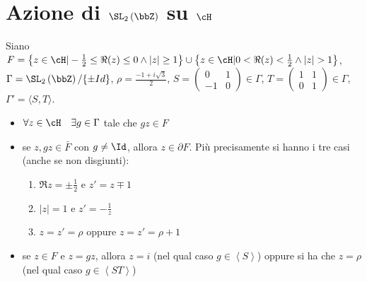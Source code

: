
\section{Azione di $\SL_2 \left( \bbZ \right)$ su $\cH$}

Siano $F=\left\{z \in \cH | -\frac{1}{2} \leq \Re(z) \leq 0
\wedge |z| \geq 1 \right\} \cup
\left\{z \in \cH | 0 < \Re(z) < \frac{1}{2} \wedge |z| > 1 \right\}$,
$\Gamma = \SL_2 \left( \bbZ \right)/\{\pm Id\}$,   $\rho=\frac{-1+i\sqrt{3}}{2}$,
$S=\left( \begin{array}{cc} 0 & 1 \\ -1 & 0 \end{array} \right) \in \Gamma$,
$T=\left( \begin{array}{cc} 1 & 1 \\ 0 & 1 \end{array} \right) \in \Gamma$,
$\Gamma' = \langle S, T \rangle$.

\begin{teorema}
\begin{itemize}
\item[P0] $\forall z \in \cH \quad \exists g \in \Gamma$ tale che $gz \in F$
\item[P1] se $z,gz \in \bar{F}$ con $g \neq \Id$, allora $z \in \partial F$.
  Più precisamente si hanno i tre casi (anche se non disgiunti):
  \begin{enumerate}
  \item[C1] $\Re z = \pm \frac{1}{2}$ e $z' = z \mp 1$
  \item[C2] $|z| = 1$ e $z' = - \frac{1}{z}$
  \item[C3] $z = z' = \rho$ oppure $z = z' = \rho + 1$
  \end{enumerate}
\item[P2] se $z \in F$ e $z=gz$,
  allora $z=i$ (nel qual caso $g \in \left\langle S \right\rangle$) oppure si ha che
  $z= \rho$ (nel qual caso $g \in \left\langle ST \right\rangle$)
\end{itemize}
\end{teorema}

